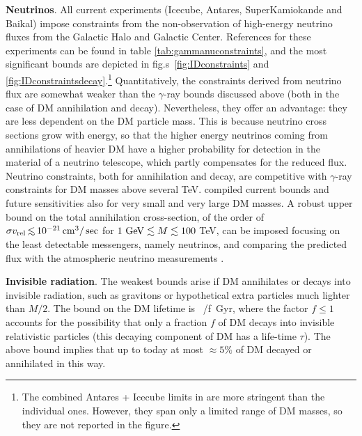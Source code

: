 {\bf Neutrinos}. All current experiments ({\sc Icecube}, {\sc Antares}, {\sc SuperKamiokande} and {\sc Baikal}) impose constraints from the non-observation of high-energy neutrino fluxes from the Galactic Halo and Galactic Center. References for these experiments can be found in table \ref{tab:gammanuconstraints}, and the most significant bounds are depicted in fig.s~\ref{fig:IDconstraints} and \ref{fig:IDconstraintsdecay}.\footnote{The combined {\sc Antares + Icecube} limits in \cite{2003.06614} are more stringent than the individual ones. However, they span only a limited range of DM masses, 
so they are not reported in the figure.} 
Quantitatively, the constraints derived from neutrino flux are somewhat weaker  than the $\gamma$-ray bounds discussed above (both in the case of DM annihilation and decay).  
Nevertheless, they offer an advantage:  they are less dependent on the DM particle mass.
This is because neutrino cross sections grow with energy, so that the higher energy neutrinos coming from annihilations of heavier DM have a higher probability for detection in the material of a neutrino telescope, which partly compensates for the reduced flux.
Neutrino constraints, both for annihilation and decay, are competitive with $\gamma$-ray constraints for DM masses above several TeV. 
 \cite{Arguelles:2019ouk} compiled current bounds and future sensitivities also for very small and very large DM masses.
A robust upper bound on the total annihilation cross-section, of the order of $\sigma v_{\rm rel} \circa{<} 10^{-21}\cm^3/\sec$ for $1 \ {\rm GeV} \lesssim M \lesssim 100$ TeV, can be imposed focusing on the least detectable messengers, namely neutrinos, and comparing the predicted flux with the atmospheric neutrino measurements \cite{ultimateannbound}.

\smallskip

{\bf Invisible radiation}.
The weakest bounds arise if DM annihilates or decays into invisible radiation, such as gravitons or  hypothetical extra particles much lighter than $M/2$.
The bound on the DM lifetime is~\cite{DMinvisibleDecay}
\beq \tau/f   \,{\rm Gyr}, 
\eeq
where the factor $f\le 1$ accounts for the possibility that only a fraction $f$ of DM decays into invisible relativistic particles (this decaying component of DM has a life-time $\tau$). 
The above bound implies that up to today at most $\approx 5\%$ of DM decayed or annihilated in this way.


\smallskip

